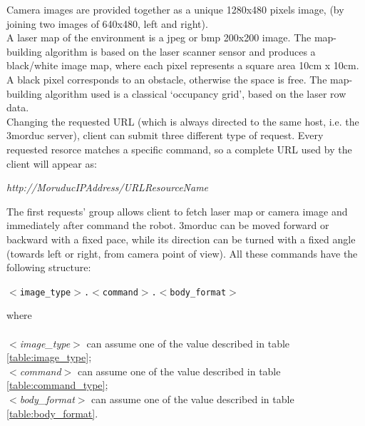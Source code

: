 Camera images are provided together as a unique 1280x480 pixels image, 
(by joining two images of 640x480, left and right).
\\
A laser map of the environment is a jpeg or bmp 200x200 image. The map-building
algorithm is based on the laser scanner sensor and produces a black/white image
map, where each pixel represents a square area 10cm x 10cm. A black pixel corresponds
to an obstacle, otherwise the space is free. The map-building algorithm used is a
classical `occupancy grid', based on the laser row data.
\\
Changing the requested URL (which is always directed to the same host,
i.e. the 3morduc server), client can submit three different type of request.
Every requested resorce matches a specific command, so a complete URL used
by the client will appear as:

\begin{center}
  \textit{http://MoruducIPAddress/URLResourceName}
\end{center}

The first requests' group allows client to fetch laser map or camera image and
immediately after command the robot. 3morduc can be moved
forward or backward with a fixed pace, while its direction can be turned
with a fixed angle (towards left or right, from camera point
of view). All these commands have the following structure:

\begin{center}
  \texttt{$<$image\_type$>$.$<$command$>$.$<$body\_format$>$}
\end{center}

where \\ \\
\textit{$<$image\_type$>$} can assume one of the value described in table
\ref{table:image_type};\\
\textit{$<$command$>$} can assume one of the value described in table
\ref{table:command_type};\\
\textit{$<$body\_format$>$} can assume one of the value described in table
\ref{table:body_format}. \\


